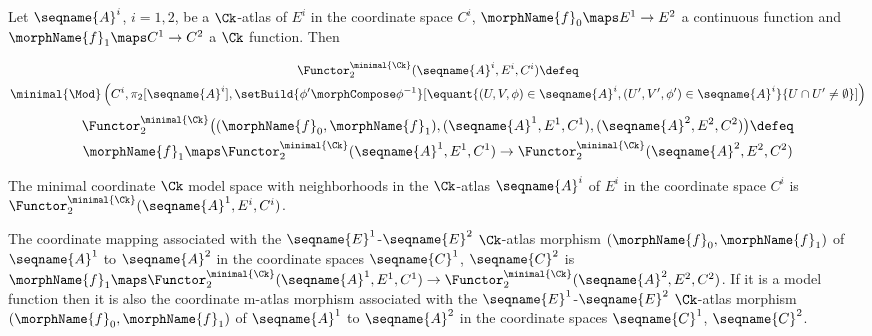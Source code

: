 \documentclass{article}
\begin{document}
\begin{definition}
\label{def:Ck-modC}
Let $\seqname{A}^i$, $i=1,2$, be a $\Ck$-atlas of $E^i$ in
the coordinate space $C^i$, $\morphName{f}_0 \maps E^1 \to E^2$ a
continuous function and $\morphName{f}_1 \maps C^1 \to C^2$ a $\Ck$
function. Then

\begin{multline}
\Functor^{\minimal{\Ck}}_2 (\seqname{A}^i, E^i, C^i)
\defeq \\
\minimal{\Mod}
  \left (
    C^i,
    \pi_2[\seqname{A}^i],
    \setBuild
      {\phi' \morphCompose \phi^{-1}}%
      [
        \equant
          {
            {(U,V,\phi) \in \seqname{A}^i},
            {(U',V',\phi') \in \seqname{A}^i}
          }
          {
            U \cap U' \ne \emptyset
          }
      ]
  \right )
\end{multline}
\begin{multline}
\Functor^{\minimal{\Ck}}_2
  \bigl (
    (
      \morphName{f}_0,
      \morphName{f}_1
    ),
    (\seqname{A}^1, E^1, C^1),
    (\seqname{A}^2, E^2, C^2)
  \bigr )
\defeq \\
  \morphName{f}_1
  \maps
  \Functor^{\minimal{\Ck}}_2 (\seqname{A}^1, E^1, C^1)
  \to
  \Functor^{\minimal{\Ck}}_2 (\seqname{A}^2, E^2, C^2)
\end{multline}

The minimal coordinate $\Ck$ model space with neighborhoods in the
$\Ck$-atlas $\seqname{A}^i$ of $E^i$ in the coordinate space $C^i$ is
$\Functor^{\minimal{\Ck}}_2 (\seqname{A}^1, E^i, C^i)$.

The coordinate mapping associated with the
$\seqname{E}^1$-$\seqname{E}^2$ $\Ck$-atlas morphism
$(\morphName{f}_0,\morphName{f}_1)$ of $\seqname{A}^1$ to $\seqname{A}^2$
in the coordinate spaces $\seqname{C}^1$, $\seqname{C}^2$ is
$
  \morphName{f}_1
  \maps
  \Functor^{\minimal{\Ck}}_2 (\seqname{A}^1, E^1, C^1)
  \to
  \Functor^{\minimal{\Ck}}_2 (\seqname{A}^2, E^2, C^2)
$.
If it is a model function then it is also the
coordinate m-atlas morphism associated with the
$\seqname{E}^1$-$\seqname{E}^2$ $\Ck$-atlas morphism
$(\morphName{f}_0,\morphName{f}_1)$ of $\seqname{A}^1$ to $\seqname{A}^2$
in the coordinate spaces $\seqname{C}^1$, $\seqname{C}^2$.
\end{definition}
\end{document}
